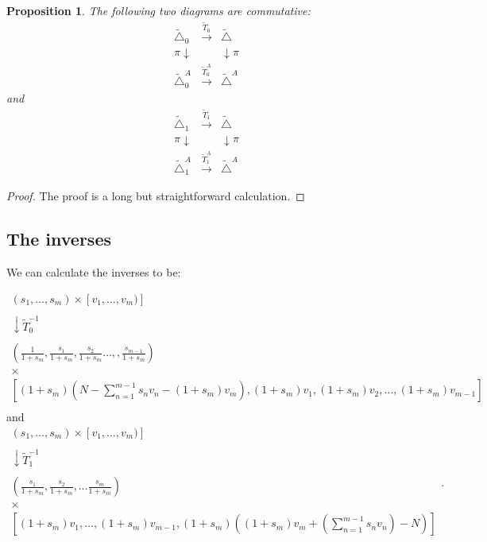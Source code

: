 \documentclass[12pt,oneside,openany]{article}
\newtheorem{prop}[theorem]{Proposition}
\begin{document}
\begin{prop} The following two diagrams are commutative:
$$\begin{matrix} 
\tilde{\triangle}_0 & \xrightarrow{\tilde{T}_0} & \tilde{\triangle} \\
\pi \downarrow & & \downarrow \pi \\
\tilde{\triangle}_0^A & \xrightarrow{\tilde{T}_0^A} & \tilde{\triangle}^A 
\end{matrix}$$
and
$$\begin{matrix} 
\tilde{\triangle}_1 & \xrightarrow{\tilde{T}_1} & \tilde{\triangle} \\
\pi \downarrow & & \downarrow \pi \\
\tilde{\triangle}_1^A & \xrightarrow{\tilde{T}_1^A} & \tilde{\triangle}^A 
\end{matrix}$$
\end{prop} 
\begin{proof}The proof is a long but straightforward calculation. \end{proof}


\subsection{The inverses}

We can calculate the inverses to be:

$$\begin{array}{c}
(s_1, \ldots, s_m) \times  [v_1, \ldots, v_m)] \\ \\
\downarrow \tilde{T}_0^{-1} \\ \\
\left(   \frac{1}{1+s_m}   ,    \frac{s_1}{1+s_m}   ,  \frac{s_2}{1+s_m}   \ldots,   ,    \frac{s_{m-1}}{1+s_m}       \right)\\
 \times \\
  \left[ (1+s_m) \left(  N- \sum_{n=1}^{m-1} s_n v_n - (1+s_m) v_m   \right) , (1+s_m) v_1, (1+s_m)v_2, \ldots, (1+s_m) v_{m-1}  \right] \\
\end{array}$$
and
$$\begin{array}{c}
(s_1, \ldots, s_m) \times  [v_1, \ldots, v_m)] \\ \\
\downarrow \tilde{T}_1^{-1} \\ \\
\left(   \frac{s_1}{1+s_m}   ,  \frac{s_2}{1+s_m}     , \ldots  \frac{s_m}{1+s_m}      \right) \\
 \times \\
 \left[   (1+s_m)v_1, \ldots, (1+s_m)v_{m-1}, (1+s_m) \left( (1+s_m)v_m + \left( \sum_{n=1}^{m-1} s_nv_n\right)  - N \right)      \right]\\
\end{array}.$$
\end{document}
